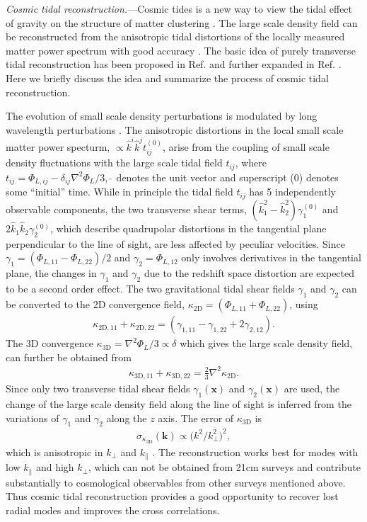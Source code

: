 \documentclass[aps,prl,twocolumn,showpacs,superscriptaddress,groupedaddress,nofootinbib]{revtex4}  %
\newcommand{\mr}{\mathrm}
\begin{document}
{\it Cosmic tidal reconstruction.}---Cosmic tides is a new way to view the
tidal effect of gravity on the structure of matter clustering \cite{2012:pen}.
The large scale density field can be reconstructed from the anisotropic tidal 
distortions of the locally measured matter power spectrum with good
accuracy \cite{2012:pen}\cite{2015:zhu}.
The basic idea of purely transverse tidal reconstruction has been proposed in
Ref. \cite{2012:pen} and further expanded in Ref. \cite{2015:zhu}.
Here we briefly discuss the idea and summarize the process of cosmic
tidal reconstruction. 

The evolution of small scale density perturbations is modulated by long 
wavelength perturbations \cite{2014:tidal}. 
The anisotropic distortions in the local small scale matter power specturm,
$\propto\hat{k}^i\hat{k}^jt_{ij}^{(0)}$, arise from the coupling of small scale
density fluctuations with the large scale tidal field $t_{ij}$, where 
$t_{ij}=\Phi_{L,ij}-\delta_{ij}\nabla^2\Phi_L/3$, $\hat{\ }$ denotes the 
unit vector and superscript (0) denotes some ``initial'' time. 
While in principle the tidal field $t_{ij}$ has 5 independently observable
components, the two transverse shear terms, 
$(\hat{k}^2_1-\hat{k}^2_2)\gamma_1^{(0)}$ and 
$2\hat{k}_1\hat{k}_2\gamma_2^{(0)}$, 
which describe quadrupolar distortions in the tangential plane perpendicular
to the line of sight, are less affected by peculiar velocities.
Since $\gamma_1=(\Phi_{L,11}-\Phi_{L,22})/2$ and $\gamma_2=\Phi_{L,12}$
only involves derivatives in the tangential plane, the changes in $\gamma_1$
and $\gamma_2$ due to the redshift space distortion are expected to be a second
order effect. The two gravitational tidal shear fields $\gamma_1$ and $\gamma_2$
can be converted to the 2D convergence field, 
$\kappa_\mr{2D}=(\Phi_{L,11}+\Phi_{L,22})$, using
\begin{eqnarray}
\label{eq:kappa2d}
\kappa_{\mr{2D},11}+\kappa_{\mr{2D},22}=
(\gamma_{1,11}-\gamma_{1,22}+2\gamma_{2,12}).
\end{eqnarray}
The 3D convergence $\kappa_\mr{3D}=\nabla^2\Phi_L/3\propto\delta$ which gives
the large scale density field, can further be obtained from
\begin{eqnarray}
\label{eq:kappa3d}
\kappa_{\mr{3D},11}+\kappa_{\mr{3D},22}=\frac{2}{3}\nabla^2\kappa_\mr{2D}.
\end{eqnarray}
Since only two transverse tidal shear fields $\gamma_1(\bm{x})$ and 
$\gamma_2(\bm{x})$ are used, the change of the large scale density field along
the line of sight is inferred from the variations of $\gamma_1$ and $\gamma_2$
along the $z$ axis. The error of $\kappa_\mr{3D}$ is 
\begin{eqnarray}
\sigma_{\kappa_\mr{3D}}(\bm{k})\propto\big({k^2}/{k_\perp^2}\big)^2,
\end{eqnarray}
which is anisotropic in $k_\perp$ and $k_\parallel$ \cite{2015:zhu}.
The reconstruction works best for modes with low $k_\parallel$ and high 
$k_\perp$, which can not be obtained from 21cm surveys and contribute 
substantially to cosmological observables from other surveys mentioned above.
Thus cosmic tidal reconstruction provides a good opportunity to recover lost 
radial modes and improves the cross correlations.
\end{document}
